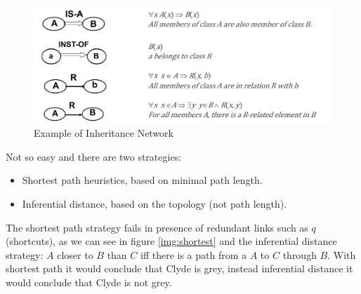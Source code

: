 \begin{figure}
	\includegraphics[width=\textwidth]{Images/inheritanceNetwork}
	\caption{Example of Inheritance Network}
	\label{img:inheritanceNetwork}
\end{figure}
Not so easy and there are two strategies:
\begin{itemize}
    \item Shortest path heuristics, based on minimal path length.
    \item Inferential distance, based on the topology (not path length).
\end{itemize}
The shortest path strategy fails in presence of redundant links such as $q$ (shortcuts),
as we can see in figure \ref{img:shortest} and the inferential distance strategy:
$A$ closer to $B$ than $C$ iff there is a path from a $A$ to $C$ through $B$.\newline
With shortest path it would conclude that Clyde is grey, instead inferential distance
it would conclude that Clyde is not grey.

